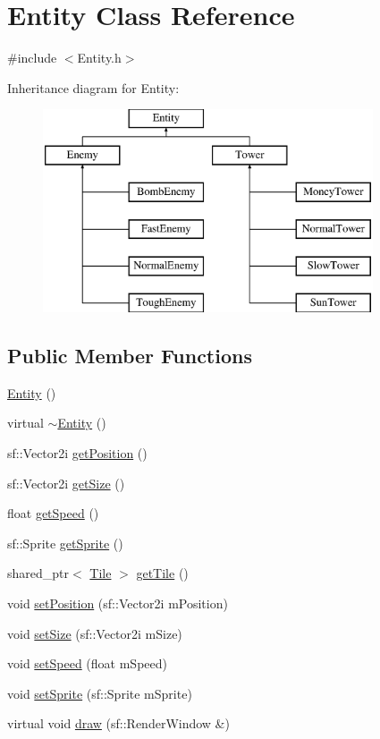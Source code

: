 \hypertarget{class_entity}{\section{Entity Class Reference}
\label{class_entity}
}


{\ttfamily \#include $<$Entity.\+h$>$}

Inheritance diagram for Entity\+:\begin{figure}[H]
\begin{center}
\leavevmode
\includegraphics[height=6.000000cm]{class_entity}
\end{center}
\end{figure}
\subsection*{Public Member Functions}
\begin{DoxyCompactItemize}
\item 
\hyperlink{class_entity_a980f368aa07ce358583982821533a54a}{Entity} ()
\item 
virtual \hyperlink{class_entity_adf6d3f7cb1b2ba029b6b048a395cc8ae}{$\sim$\+Entity} ()
\item 
sf\+::\+Vector2i \hyperlink{class_entity_a1bc281383bd777ba96dd0c7c989ba1e7}{get\+Position} ()
\item 
sf\+::\+Vector2i \hyperlink{class_entity_aad4cbcdad1ba43221eff4e5474dfdd58}{get\+Size} ()
\item 
float \hyperlink{class_entity_a1ab1df6a898303e678a11d727016dd09}{get\+Speed} ()
\item 
sf\+::\+Sprite \hyperlink{class_entity_aa5dd2cfe8cd0bd31e908752bf7c4b510}{get\+Sprite} ()
\item 
shared\+\_\+ptr$<$ \hyperlink{class_tile}{Tile} $>$ \hyperlink{class_entity_a4c0e3e14381db594a39b0b1fa69b9bc7}{get\+Tile} ()
\item 
void \hyperlink{class_entity_a999e10122f45fb582c2d4976f12e4c3e}{set\+Position} (sf\+::\+Vector2i m\+Position)
\item 
void \hyperlink{class_entity_a5d01a1d6f13fa685d75ac657d2e72b6b}{set\+Size} (sf\+::\+Vector2i m\+Size)
\item 
void \hyperlink{class_entity_a752b7fb05557c905dcdce931500e700e}{set\+Speed} (float m\+Speed)
\item 
void \hyperlink{class_entity_acffd8697cae92e62b0962c78e2d45d06}{set\+Sprite} (sf\+::\+Sprite m\+Sprite)
\item 
virtual void \hyperlink{class_entity_a0eca969d39e7b7bc728236f85e02bbb6}{draw} (sf\+::\+Render\+Window \&)
\end{DoxyCompactItemize}
